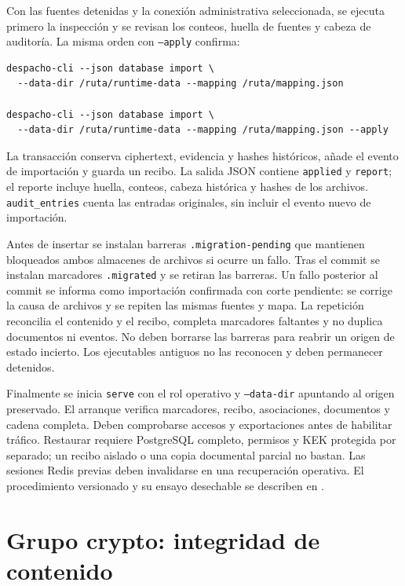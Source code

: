 Con las fuentes detenidas y la conexión administrativa seleccionada, se ejecuta
primero la inspección y se revisan los conteos, huella de fuentes y cabeza de
auditoría. La misma orden con \texttt{--apply} confirma:

\begin{lstlisting}[numbers=none]
despacho-cli --json database import \
  --data-dir /ruta/runtime-data --mapping /ruta/mapping.json

despacho-cli --json database import \
  --data-dir /ruta/runtime-data --mapping /ruta/mapping.json --apply
\end{lstlisting}

La transacción conserva ciphertext, evidencia y hashes históricos, añade el
evento de importación y guarda un recibo. La salida JSON contiene
\texttt{applied} y \texttt{report}; el reporte incluye huella, conteos,
cabeza histórica y hashes de los archivos. \texttt{audit\_entries} cuenta
las entradas originales, sin incluir el evento nuevo de importación.

Antes de insertar se instalan barreras \texttt{.migration-pending} que mantienen
bloqueados ambos almacenes de archivos si ocurre un fallo. Tras el commit se
instalan marcadores \texttt{.migrated} y se retiran las barreras. Un fallo
posterior al commit se informa como importación confirmada con corte pendiente:
se corrige la causa de archivos y se repiten las mismas fuentes y mapa. La
repetición reconcilia el contenido y el recibo, completa marcadores faltantes
y no duplica documentos ni eventos. No deben borrarse las barreras para reabrir
un origen de estado incierto. Los ejecutables antiguos no las reconocen y deben
permanecer detenidos.

Finalmente se inicia \texttt{serve} con el rol operativo y
\texttt{--data-dir} apuntando al origen preservado. El arranque verifica
marcadores, recibo, asociaciones, documentos y cadena completa. Deben comprobarse
accesos y exportaciones antes de habilitar tráfico. Restaurar requiere PostgreSQL
completo, permisos y KEK protegida por separado; un recibo aislado o una copia
documental parcial no bastan. Las sesiones Redis previas deben invalidarse en
una recuperación operativa. El procedimiento versionado y su ensayo desechable
se describen en \rutarepo{docs/database-operations.md}.

\section{Grupo crypto: integridad de contenido}\label{sec:cli-crypto}

